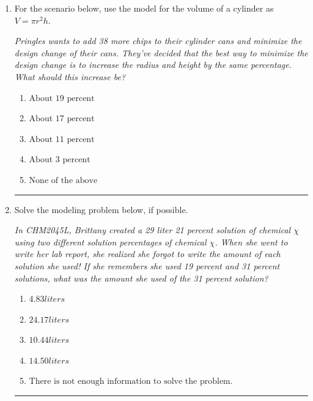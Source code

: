 \documentclass[14pt]{extbook}
\newcommand{\litem}[1]{\item#1\hspace*{-1cm}\rule{\textwidth}{0.4pt}}
\begin{document}
\begin{enumerate}
{\begin{enumerate}[label=\Alph*.]
\end{enumerate} }
\litem{
For the scenario below, use the model for the volume of a cylinder as $V = \pi r^2 h$.
\begin{center}
    \textit{ Pringles wants to add 38 \text{percent} more chips to their cylinder cans and minimize the design change of their cans. They've decided that the best way to minimize the design change is to increase the radius and height by the same percentage. What should this increase be? }
\end{center}
\begin{enumerate}[label=\Alph*.]
\item \( \text{About } 19 \text{ percent} \)
\item \( \text{About } 17 \text{ percent} \)
\item \( \text{About } 11 \text{ percent} \)
\item \( \text{About } 3 \text{ percent} \)
\item \( \text{None of the above} \)

\end{enumerate} }
\litem{
Solve the modeling problem below, if possible.
\begin{center}
    \textit{ In CHM2045L, Brittany created a 29 liter 21 percent solution of chemical $\chi$ using two different solution percentages of chemical $\chi$. When she went to write her lab report, she realized she forgot to write the amount of each solution she used! If she remembers she used 19 percent and 31 percent solutions, what was the amount she used of the 31 percent solution? }
\end{center}
\begin{enumerate}[label=\Alph*.]
\item \( 4.83 liters \)
\item \( 24.17 liters \)
\item \( 10.44 liters \)
\item \( 14.50 liters \)
\item \( \text{There is not enough information to solve the problem.} \)


\end{enumerate}}
\end{enumerate}
\end{document}
